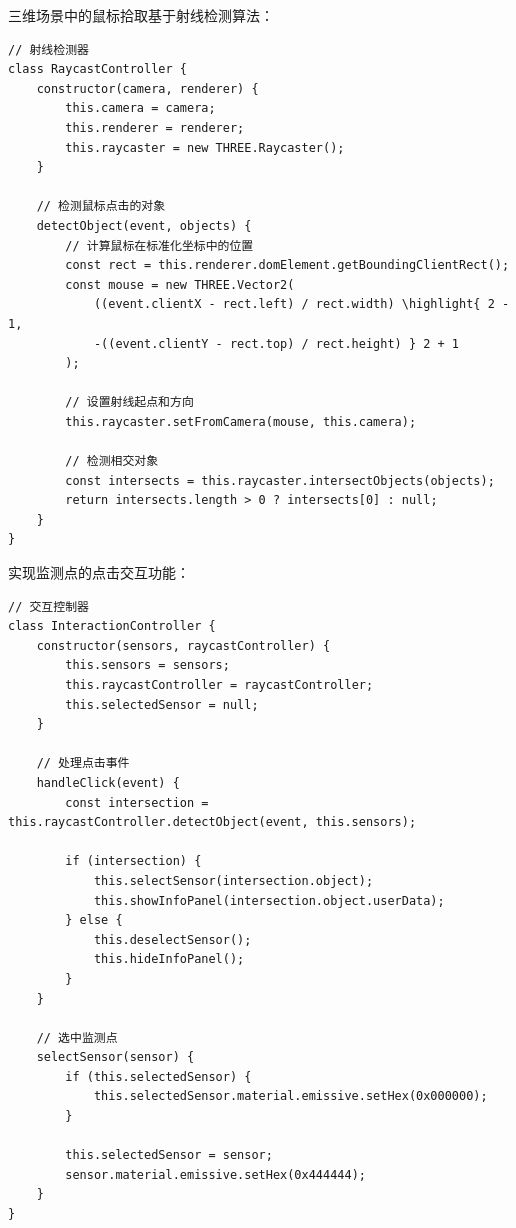 
三维场景中的鼠标拾取基于射线检测算法：

\begin{lstlisting}[style=javascript]
// 射线检测器
class RaycastController {
    constructor(camera, renderer) {
        this.camera = camera;
        this.renderer = renderer;
        this.raycaster = new THREE.Raycaster();
    }
    
    // 检测鼠标点击的对象
    detectObject(event, objects) {
        // 计算鼠标在标准化坐标中的位置
        const rect = this.renderer.domElement.getBoundingClientRect();
        const mouse = new THREE.Vector2(
            ((event.clientX - rect.left) / rect.width) \highlight{ 2 - 1,
            -((event.clientY - rect.top) / rect.height) } 2 + 1
        );
        
        // 设置射线起点和方向
        this.raycaster.setFromCamera(mouse, this.camera);
        
        // 检测相交对象
        const intersects = this.raycaster.intersectObjects(objects);
        return intersects.length > 0 ? intersects[0] : null;
    }
}
\end{lstlisting}


实现监测点的点击交互功能：

\begin{lstlisting}[style=javascript]
// 交互控制器
class InteractionController {
    constructor(sensors, raycastController) {
        this.sensors = sensors;
        this.raycastController = raycastController;
        this.selectedSensor = null;
    }
    
    // 处理点击事件
    handleClick(event) {
        const intersection = this.raycastController.detectObject(event, this.sensors);
        
        if (intersection) {
            this.selectSensor(intersection.object);
            this.showInfoPanel(intersection.object.userData);
        } else {
            this.deselectSensor();
            this.hideInfoPanel();
        }
    }
    
    // 选中监测点
    selectSensor(sensor) {
        if (this.selectedSensor) {
            this.selectedSensor.material.emissive.setHex(0x000000);
        }
        
        this.selectedSensor = sensor;
        sensor.material.emissive.setHex(0x444444);
    }
}
\end{lstlisting}

